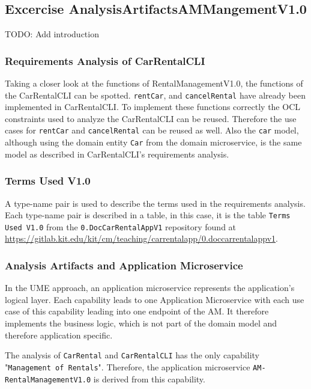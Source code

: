 \subsection{Excercise AnalysisArtifactsAMMangementV1.0}
TODO: Add introduction
\subsubsection*{Requirements Analysis of CarRentalCLI}
Taking a closer look at the functions of RentalManagementV1.0, the functions of the CarRentalCLI can be spotted.
\texttt{rentCar}, and \texttt{cancelRental} have already been implemented in CarRentalCLI.
To implement these functions correctly the OCL constraints used to analyze the CarRentalCLI can be reused.
Therefore the use cases for \texttt{rentCar} and \texttt{cancelRental} can be reused as well.
Also the \texttt{car} model, although using the domain entity \texttt{Car} from the domain microservice, is the same model as described in CarRentalCLI's requirements analysis.
\subsubsection*{Terms Used V1.0}
A type-name pair is used to describe the terms used in the requirements analysis.
Each type-name pair is described in a table, in this case, it is the table \texttt{Terms Used V1.0} from the \texttt{0.DocCarRentalAppV1} repository found at \url{https://gitlab.kit.edu/kit/cm/teaching/carrentalapp/0.doccarrentalappv1}.

\subsubsection*{Analysis Artifacts and Application Microservice}
In the UME approach, an application microservice represents the application's logical layer.
Each capability leads to one Application Microservice with each use case of this capability leading into one endpoint of the AM.
It therefore implements the business logic, which is not part of the domain model and therefore application specific.

The analysis of \texttt{CarRental} and \texttt{CarRentalCLI} has the only capability "\texttt{Management of Rentals}".
Therefore, the application microservice \texttt{AM-RentalManagementV1.0} is derived from this capability.

